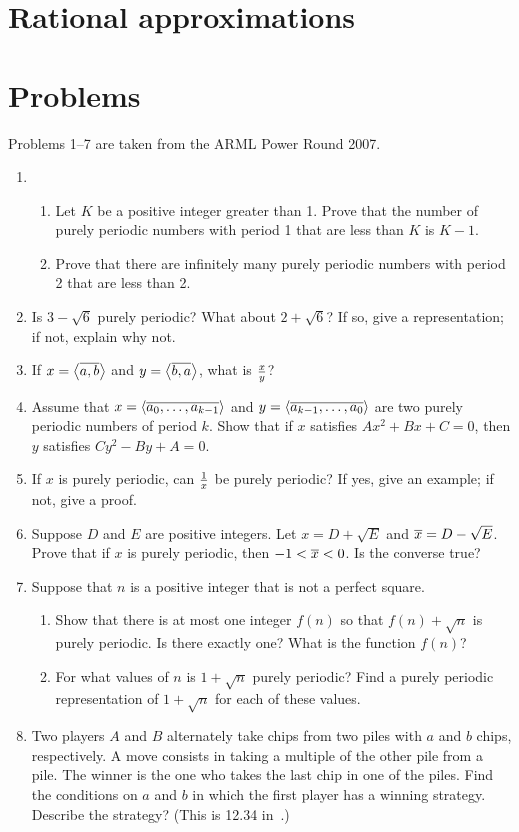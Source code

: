 \section{Rational approximations}
\section{Problems}
Problems 1--7 are taken from the ARML Power Round 2007.
\begin{enumerate}
\item
\begin{enumerate}
\item
Let $K$ be a positive integer greater than 1. Prove that the number of purely periodic numbers with period 1 that are less than $K$ is $K-1$.
\item
Prove that there are infinitely many purely periodic numbers with period 2 that are less than 2.
\end{enumerate}
\item Is $3-\sqrt 6$ purely periodic? What about $2+\sqrt 6$? If so, give a representation; if not, explain why not.
\item If $x=\left\langle {\overline{a,b}}\right\rangle$ and $y=\left\langle {\overline{b,a}}\right\rangle$, what is $\frac{x}{y}$?
\item Assume that $x=\left\langle {\overline{a_0,\ldots, a_{k-1}}}\right\rangle$ and $y=\left\langle {\overline{a_{k-1},\ldots, a_0}}\right\rangle$ are two purely periodic numbers of period $k$. Show that if $x$ satisfies $Ax^2+Bx+C=0$, then $y$ satisfies $Cy^2-By+A=0$.
\item If $x$ is purely periodic, can $\frac{1}{x}$ be purely periodic? If yes, give an example; if not, give a proof.
\item Suppose $D$ and $E$ are positive integers. Let $x=D+\sqrt E$ and $\overline{x}=D-\sqrt E$. Prove that if $x$ is purely periodic, then $-1<\overline{x}<0$. Is the converse true?
\item Suppose that $n$ is a positive integer that is not a perfect square.
\begin{enumerate}
\item
Show that there is at most one integer $f(n)$ so that $f(n)+\sqrt n$ is purely periodic. Is there exactly one? What is the function $f(n)$? 
\item For what values of $n$ is $1+\sqrt n$ purely periodic? Find a purely periodic representation of $1+\sqrt n$ for each of these values.
\end{enumerate}
\item Two players $A$ and $B$ alternately take chips from two piles with $a$ and $b$ chips, respectively. A move consists in taking a multiple of the other pile from a pile. The winner is the one who takes the last chip in one of the piles. Find the conditions on $a$ and $b$ in which the first player has a winning strategy. Describe the strategy? (This is 12.34 in~\cite{engel}.)
\end{enumerate}
